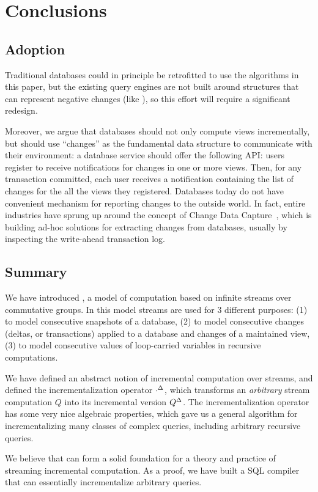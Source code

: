 \section{Conclusions}\label{sec:conclusions}%

\subsection{Adoption}

Traditional databases could in principle be retrofitted to use the
algorithms in this paper, but the existing query engines are not built
around structures that can represent negative changes (like \zrs), so
this effort will require a significant redesign.

Moreover, we argue that databases should not only compute views
incrementally, but should use ``changes'' as the fundamental data
structure to communicate with their environment: a database service
should offer the following API: users register to receive
notifications for changes in one or more views.  Then, for any
transaction committed, each user receives a notification containing
the list of changes for the all the views they registered.  Databases
today do not have convenient mechanism for reporting changes to the
outside world.  In fact, entire industries have sprung up around the
concept of Change Data Capture~\cite{cdc}, which is building ad-hoc
solutions for extracting changes from databases, usually by inspecting
the write-ahead transaction log.

\subsection{Summary}

We have introduced \dbsp, a model of computation based on infinite
streams over commutative groups.  In this model streams are used for 3
different purposes: (1) to model consecutive snapshots of a database,
(2) to model consecutive changes (deltas, or transactions) applied to
a database and changes of a maintained view, (3) to model consecutive
values of loop-carried variables in recursive computations.

We have defined an abstract notion of incremental computation over
streams, and defined the incrementalization operator ${\cdot}^{\Delta}$,
which transforms an \emph{arbitrary} stream computation $Q$ into its
incremental version ${Q}^{\Delta}$.  The incrementalization operator has
some very nice algebraic properties, which gave us a general algorithm
for incrementalizing many classes of complex queries, including
arbitrary recursive queries.

We believe that \dbsp can form a solid foundation for a theory and
practice of streaming incremental computation.  As a proof, we have
built a SQL compiler that can essentially incrementalize arbitrary
queries.
